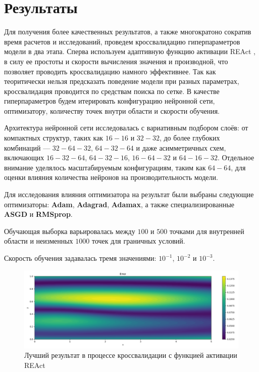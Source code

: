 \chapter{Результаты}
Для получения более качественных результатов, а также многократоно
сократив время расчетов и исследований, проведем кроссвалидацию
гиперпараметров модели в два этапа. Сперва используем адаптивную
функцию активации REAct \cite{0d752c79fb816703274a3d37f85a85689a2a9405},
в силу ее простоты и скорости вычисления значения и производной, что 
позволяет проводить кроссвалидацию намного эффективнее. Так как теоритически
нельзя предсказать поведение модели при разных параметрах, кроссвалидация
проводится по средствам поиска по сетке. В качестве
гиперпараметров будем итерировать конфигурацию нейронной сети, оптимизатору,
количеству точек внутри области и скорости обучения.

Архитектура нейронной сети исследовалась с вариативным подбором слоёв:
от компактных структур, таких как $16-16$ и $32-32$, до более глубоких
комбинаций --- $32-64-32$, $64-32-64$ и даже асимметричных схем, включающих
$16-32-64$, $64-32-16$, $16-64-32$ и $64-16-32$. Отдельное внимание уделялось
масштабируемым конфигурациям, таким как $64-64$, для оценки влияния
количества нейронов на производительность модели.

Для исследования влияния оптимизатора на результат были выбраны
следующие оптимизаторы: \textbf{Adam}, \textbf{Adagrad}, \textbf{Adamax},
а также специализированные \textbf{ASGD} и \textbf{RMSprop}.

Обучающая выборка варьировалась между $100$ и $500$ точками для внутренней
области и неизменных $1000$ точек для граничных условий. 

Скорость обучения задавалась тремя значениями: $10^{-1}$, $10^{-2}$ и $10^{-3}$.


\begin{figure}[ht]
    \includegraphics{data/couette_react_error_best.png}
    \caption{Лучший результат в процессе кроссвалидации с функцией активации REAct}
    \label{fig:couette_react_best}
\end{figure}


